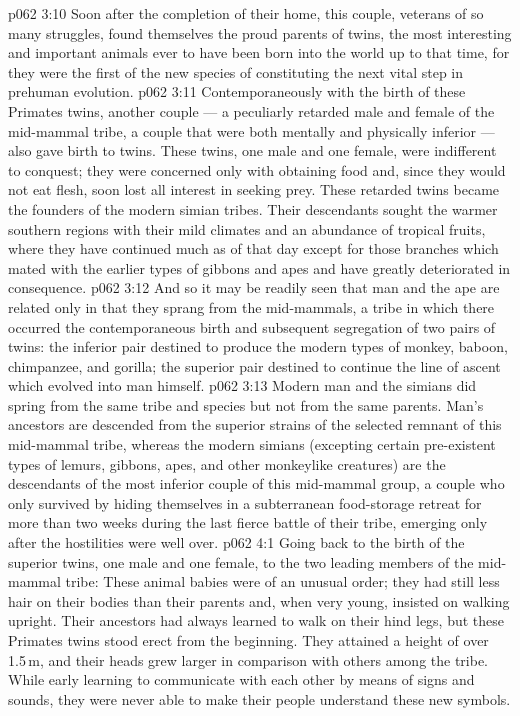 \vs p062 3:10 Soon after the completion of their home, this couple, veterans of so many struggles, found themselves the proud parents of twins, the most interesting and important animals ever to have been born into the world up to that time, for they were the first of the new species of  constituting the next vital step in prehuman evolution.
\vs p062 3:11 \pc Contemporaneously with the birth of these Primates twins, another couple --- a peculiarly retarded male and female of the mid\hyp{}mammal tribe, a couple that were both mentally and physically inferior --- also gave birth to twins. These twins, one male and one female, were indifferent to conquest; they were concerned only with obtaining food and, since they would not eat flesh, soon lost all interest in seeking prey. These retarded twins became the founders of the modern simian tribes. Their descendants sought the warmer southern regions with their mild climates and an abundance of tropical fruits, where they have continued much as of that day except for those branches which mated with the earlier types of gibbons and apes and have greatly deteriorated in consequence.
\vs p062 3:12 And so it may be readily seen that man and the ape are related only in that they sprang from the mid\hyp{}mammals, a tribe in which there occurred the contemporaneous birth and subsequent segregation of two pairs of twins: the inferior pair destined to produce the modern types of monkey, baboon, chimpanzee, and gorilla; the superior pair destined to continue the line of ascent which evolved into man himself.
\vs p062 3:13 Modern man and the simians did spring from the same tribe and species but not from the same parents. Man’s ancestors are descended from the superior strains of the selected remnant of this mid\hyp{}mammal tribe, whereas the modern simians (excepting certain pre\hyp{}existent types of lemurs, gibbons, apes, and other monkeylike creatures) are the descendants of the most inferior couple of this mid\hyp{}mammal group, a couple who only survived by hiding themselves in a subterranean food\hyp{}storage retreat for more than two weeks during the last fierce battle of their tribe, emerging only after the hostilities were well over.
\vs p062 4:1 Going back to the birth of the superior twins, one male and one female, to the two leading members of the mid\hyp{}mammal tribe: These animal babies were of an unusual order; they had still less hair on their bodies than their parents and, when very young, insisted on walking upright. Their ancestors had always learned to walk on their hind legs, but these Primates twins stood erect from the beginning. They attained a height of over 1.5\,m, and their heads grew larger in comparison with others among the tribe. While early learning to communicate with each other by means of signs and sounds, they were never able to make their people understand these new symbols.
